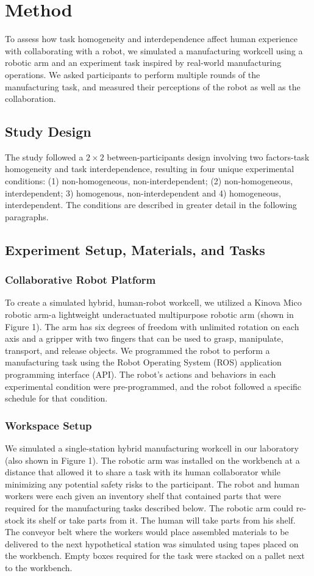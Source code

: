 \section{Method}
       To assess how task homogeneity and interdependence affect human experience with collaborating with a robot, we simulated a manufacturing workcell using a robotic arm and an experiment task inspired by real-world manufacturing operations.  We asked participants to perform multiple rounds of the manufacturing task, and measured their perceptions of the robot as well as the collaboration.
\subsection{Study Design}
       The study followed  a $2\times2$ between-participants design involving two factors-task homogeneity and task interdependence, resulting in four unique experimental conditions: (1) non-homogeneous, non-interdependent; (2) non-homogeneous, interdependent; 3) homogenous, non-interdependent and 4) homogeneous, interdependent. The conditions are described in greater detail in the following paragraphs.

\subsection{Experiment Setup, Materials, and Tasks}
\subsubsection{Collaborative Robot Platform}
       To create a simulated hybrid, human-robot workcell, we utilized a Kinova Mico robotic arm-a lightweight underactuated multipurpose robotic arm (shown in Figure 1). The arm has six degrees of freedom with unlimited rotation on each axis and a gripper with two fingers that can be used to grasp, manipulate, transport, and release objects. We programmed the robot to perform a manufacturing task using the Robot Operating System (ROS) application programming interface (API). The robot's actions and behaviors in each experimental condition were pre-programmed, and the robot followed a specific schedule for that condition.
\subsubsection{Workspace Setup}
        We simulated a single-station hybrid manufacturing workcell in our laboratory (also shown in Figure 1). The robotic arm was installed on the workbench at a distance that allowed it to share a task with its human collaborator while minimizing any potential safety risks to the participant. The robot and human workers were each given an inventory shelf that contained parts that were required for the manufacturing tasks described below. The robotic arm could re-stock its shelf or take parts from it. The human will take parts from his shelf. The  conveyor belt where the workers would place assembled materials to be delivered to the next hypothetical station was simulated using tapes placed on the workbench. Empty boxes required for the task were stacked on a pallet next to the workbench.
